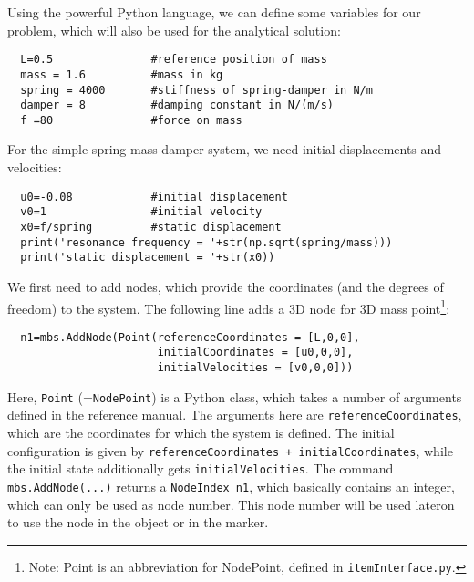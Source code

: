 %
Using the powerful Python language, we can define some variables for our problem, which will also be used for the analytical solution:
\pythonstyle\begin{lstlisting}
  L=0.5               #reference position of mass
  mass = 1.6          #mass in kg
  spring = 4000       #stiffness of spring-damper in N/m
  damper = 8          #damping constant in N/(m/s)
  f =80               #force on mass
\end{lstlisting}
%
For the simple spring-mass-damper system, we need initial displacements and velocities:
\pythonstyle\begin{lstlisting}
  u0=-0.08            #initial displacement
  v0=1                #initial velocity
  x0=f/spring         #static displacement
  print('resonance frequency = '+str(np.sqrt(spring/mass)))
  print('static displacement = '+str(x0))
\end{lstlisting}
%
We first need to add nodes, which provide the coordinates (and the degrees of freedom) to the system.
The following line adds a 3D node for 3D mass point\footnote{Note: Point is an abbreviation for NodePoint, defined in \texttt{itemInterface.py}.}:
\pythonstyle\begin{lstlisting}
  n1=mbs.AddNode(Point(referenceCoordinates = [L,0,0], 
                       initialCoordinates = [u0,0,0], 
                       initialVelocities = [v0,0,0]))
\end{lstlisting}
Here, \texttt{Point} (=\texttt{NodePoint}) is a Python class, which takes a number of arguments defined in the reference manual. The arguments here are \texttt{referenceCoordinates}, which are the coordinates for which the system is defined. The initial configuration is given by \texttt{referenceCoordinates + initialCoordinates}, while the initial state additionally gets \texttt{initialVelocities}.
The command \texttt{mbs.AddNode(...)} returns a \texttt{NodeIndex n1}, which basically contains an integer, which can only be used as node number. This node number will be used lateron to use the node in the object or in the marker.

